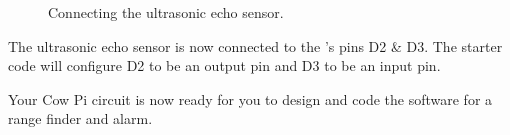 \begin{figure}
{        \label{fig:ultrasonicD2D3}
    }
    \hfil
    \hfil
    \caption{Connecting the ultrasonic echo sensor.}
\end{figure}

The ultrasonic echo sensor is now connected to the \developmentboard's pins D2 \& D3.
The starter code will configure D2 to be an output pin and D3 to be an input pin.


\vspace{1cm}

Your Cow Pi circuit is now ready for you to design and code the software for a range finder and alarm.
